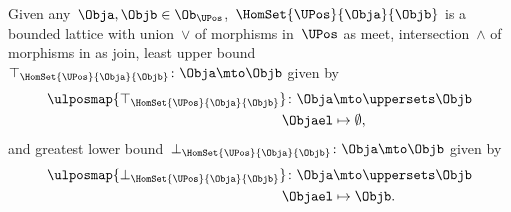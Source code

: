 \begin{lemma}\label{lem:UPos-is-bounded-lattice}
    Given any~$\Obja,\Objb\in \Ob_\UPos$,~$\HomSet{\UPos}{\Obja}{\Objb}$ is a bounded lattice with union~$\vee$ of morphisms in~$\UPos$ as meet, intersection~$\wedge$ of morphisms in \UPos as join, least upper bound~$\top_{\HomSet{\UPos}{\Obja}{\Objb}}\colon \Obja \mto \Objb$ given by
    \begin{equation*}
        \begin{aligned}
        \ulposmap{\top_{\HomSet{\UPos}{\Obja}{\Objb}}}\colon \Obja &\mto \uppersets \Objb\\
            \Objael &\mapsto \emptyset,
        \end{aligned}
    \end{equation*}
    and greatest lower bound~$\bot_{\HomSet{\UPos}{\Obja}{\Objb}}\colon \Obja \mto \Objb$ given by
    \begin{equation*}
        \begin{aligned}
        \ulposmap{\bot_{\HomSet{\UPos}{\Obja}{\Objb}}}\colon \Obja &\mto \uppersets \Objb\\
            \Objael &\mapsto \Objb.
        \end{aligned}
    \end{equation*}
  \end{lemma}
